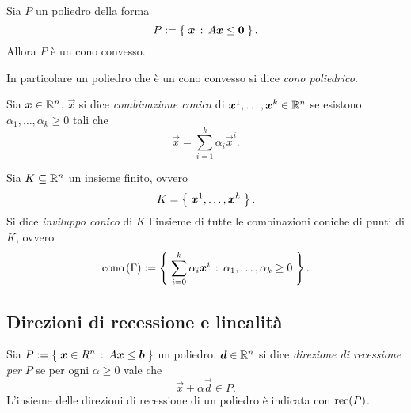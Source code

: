\begin{proposition}
    Sia $P$ un poliedro della forma \begin{equation}
        P := \left\{\;\bm{x} \,:\, A\bm{x} \leq \bm{0}\;\right\}.
    \end{equation} Allora $P$ è un cono convesso.
\end{proposition}

In particolare un poliedro che è un cono convesso si dice \emph{cono poliedrico}.

\begin{definition}
     Sia $\bm{x} \in \mathbb{R}^n$. $\vec x$ si dice \emph{combinazione conica} di $\bm{x}^1, \dots, \bm{x}^k \in \mathbb{R}^n$ se esistono $\alpha_1, \dots, \alpha_k \geq 0$ tali che \begin{equation}
        \vec x = \sum_{i = 1}^k \alpha_i\vec x^i.
    \end{equation}
\end{definition}

\begin{definition}
     Sia $K \subseteq \mathbb{R}^n$ un insieme finito, ovvero \[
        K = \left\{\;\bm{x}^1, \dots, \bm{x}^k\;\right\}.    
    \] Si dice \emph{inviluppo conico} di $K$ l'insieme di tutte le combinazioni coniche di punti di $K$, ovvero \begin{equation}
        \cono{K} \deq \set{\sum_{i = 0}^k \alpha_i\vec x^i \suchthat \alpha_1, \dots, \alpha_k \geq 0}.
    \end{equation}
\end{definition}

\subsection{Direzioni di recessione e linealità}

\begin{definition}
    Sia $P := \left\{\;\bm{x} \in R^n \,:\, A\bm{x} \leq \bm{b}\;\right\}$ un poliedro. $\bm{d} \in \mathbb{R}^n$ si dice \emph{direzione di recessione per $P$} se per ogni $\alpha \geq 0$ vale che \[
        \vec x + \alpha\vec d \in P.    
    \] L'insieme delle direzioni di recessione di un poliedro è indicata con $\operatorname{rec}(P)$.
\end{definition}

